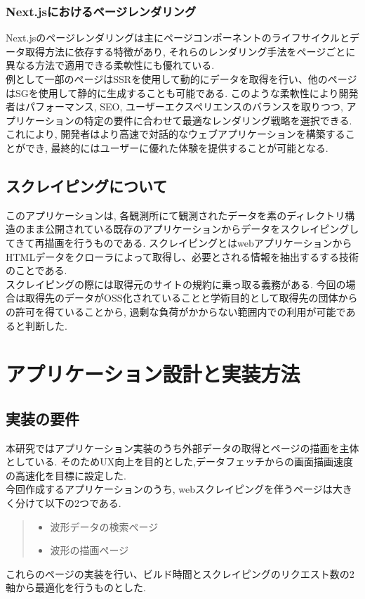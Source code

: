 \subsubsection{Next.jsにおけるページレンダリング}
Next.jsのページレンダリングは主にページコンポーネントのライフサイクルとデータ取得方法に依存する特徴があり, それらのレンダリング手法をページごとに異なる方法で適用できる柔軟性にも優れている.\\
例として一部のページはSSRを使用して動的にデータを取得を行い、他のページはSGを使用して静的に生成することも可能である.
このような柔軟性により開発者はパフォーマンス, SEO, ユーザーエクスペリエンスのバランスを取りつつ, アプリケーションの特定の要件に合わせて最適なレンダリング戦略を選択できる.
これにより, 開発者はより高速で対話的なウェブアプリケーションを構築することができ, 最終的にはユーザーに優れた体験を提供することが可能となる.

\subsection{スクレイピングについて}
このアプリケーションは, 各観測所にて観測されたデータを素のディレクトリ構造のまま公開されている既存のアプリケーションからデータをスクレイピングしてきて再描画を行うものである.
スクレイピングとはwebアプリケーションからHTMLデータをクローラによって取得し、必要とされる情報を抽出するする技術のことである.\\
スクレイピングの際には取得元のサイトの規約に乗っ取る義務がある.
今回の場合は取得先のデータがOSS化されていることと学術目的として取得先の団体からの許可を得ていることから, 過剰な負荷がかからない範囲内での利用が可能であると判断した.

\section{アプリケーション設計と実装方法}
\subsection{実装の要件}
本研究ではアプリケーション実装のうち外部データの取得とページの描画を主体としている.
そのためUX向上を目的とした,データフェッチからの画面描画速度の高速化を目標に設定した.\\
今回作成するアプリケーションのうち, webスクレイピングを伴うページは大きく分けて以下の2つである.\\
\begin{quote}
	\begin{itemize}
		\item 波形データの検索ページ
		\item 波形の描画ページ
	\end{itemize}
\end{quote}
これらのページの実装を行い、ビルド時間とスクレイピングのリクエスト数の2軸から最適化を行うものとした.

